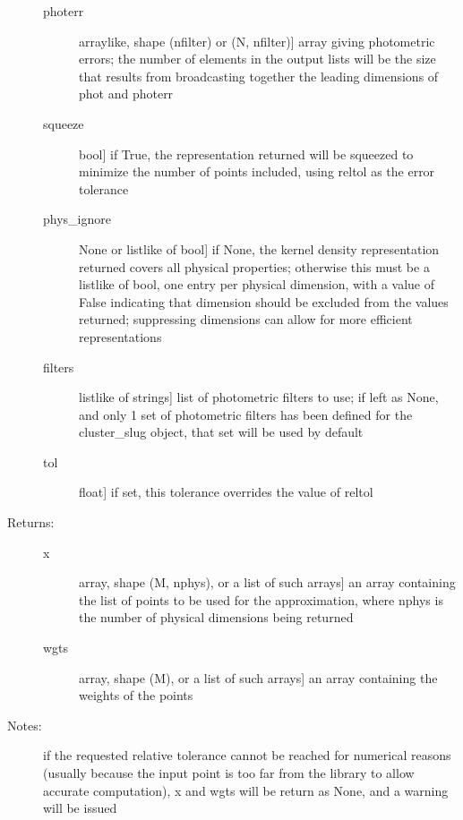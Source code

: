 \documentclass[letterpaper,10pt,english]{sphinxmanual}
\begin{document}
\begin{fulllineitems}
\begin{fulllineitems}
\begin{description}
\begin{description}
\item[{photerr}] \leavevmode{[}arraylike, shape (nfilter) or (N, nfilter){]}
array giving photometric errors; the number of elements
in the output lists will be the size that results from
broadcasting together the leading dimensions of phot and
photerr

\item[{squeeze}] \leavevmode{[}bool{]}
if True, the representation returned will be squeezed to
minimize the number of points included, using reltol as
the error tolerance

\item[{phys\_ignore}] \leavevmode{[}None or listlike of bool{]}
if None, the kernel density representation returned
covers all physical properties; otherwise this must be a
listlike of bool, one entry per physical dimension, with
a value of False indicating that dimension should be
excluded from the values returned; suppressing
dimensions can allow for more efficient representations

\item[{filters}] \leavevmode{[}listlike of strings{]}
list of photometric filters to use; if left as None, and
only 1 set of photometric filters has been defined for
the cluster\_slug object, that set will be used by
default

\item[{tol}] \leavevmode{[}float{]}
if set, this tolerance overrides the value of reltol

\end{description}

\item[{Returns:}] \leavevmode\begin{description}
\item[{x}] \leavevmode{[}array, shape (M, nphys), or a list of such arrays{]}
an array containing the list of points to be used for
the approximation, where nphys is the number of
physical dimensions being returned

\item[{wgts}] \leavevmode{[}array, shape (M), or a list of such arrays{]}
an array containing the weights of the points

\end{description}

\item[{Notes:}] \leavevmode
if the requested relative tolerance cannot be reached for
numerical reasons (usually because the input point is too
far from the library to allow accurate computation), x and
wgts will be return as None, and a warning will be issued


\end{description}
\end{fulllineitems}
\end{fulllineitems}
\end{document}
